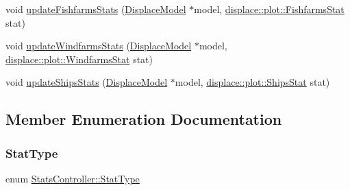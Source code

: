 \begin{DoxyCompactItemize}
\item 
void \mbox{\hyperlink{class_stats_controller_ac6ff97444b410e47285eb46764af6026}{update\+Fishfarms\+Stats}} (\mbox{\hyperlink{class_displace_model}{Displace\+Model}} $\ast$model, \mbox{\hyperlink{namespacedisplace_1_1plot_a4746af73ffe0625cf87b8fb07fd5bfa4}{displace\+::plot\+::\+Fishfarms\+Stat}} stat)
\item 
void \mbox{\hyperlink{class_stats_controller_a0eda2aa41b725b775e237a17df8a480b}{update\+Windfarms\+Stats}} (\mbox{\hyperlink{class_displace_model}{Displace\+Model}} $\ast$model, \mbox{\hyperlink{namespacedisplace_1_1plot_a8b9bfd155809bb203b09c572304a62c3}{displace\+::plot\+::\+Windfarms\+Stat}} stat)
\item 
void \mbox{\hyperlink{class_stats_controller_a47180a6975ace43dd1a3f0df275f1842}{update\+Ships\+Stats}} (\mbox{\hyperlink{class_displace_model}{Displace\+Model}} $\ast$model, \mbox{\hyperlink{namespacedisplace_1_1plot_a8c50b4d54cafba744b1b5b51b53407e0}{displace\+::plot\+::\+Ships\+Stat}} stat)
\end{DoxyCompactItemize}


\subsection{Member Enumeration Documentation}
\mbox{\label{class_stats_controller_a57467d760850639d3b0c55277b7e7ee9}} 
\subsubsection{\texorpdfstring{StatType}{StatType}}
{\footnotesize\ttfamily enum \mbox{\hyperlink{class_stats_controller_a57467d760850639d3b0c55277b7e7ee9}{Stats\+Controller\+::\+Stat\+Type}}}

